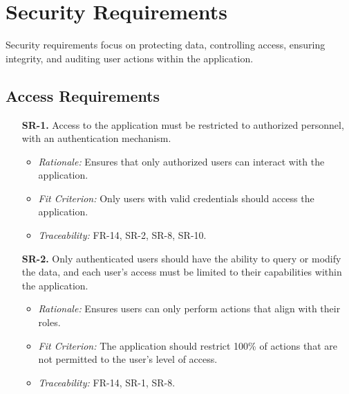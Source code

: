 \documentclass[12pt]{article}
\begin{document}
\section{Security Requirements}
Security requirements focus on protecting data, controlling access, ensuring
integrity, and auditing user actions within the application.

\subsection{Access Requirements}
\begin{enumerate}
  \item[\textbf{SR-1.}] Access to the application must be restricted to
  authorized personnel, with an authentication mechanism.
  \begin{itemize}
    \item \textit{Rationale:} Ensures that only authorized users can interact
    with the application.
    \item \textit{Fit Criterion:} Only users with valid credentials should
    access the application.
    \item \textit{Traceability:} FR-14, SR-2, SR-8, SR-10.
  \end{itemize}

  \item[\textbf{SR-2.}] Only authenticated users should have the ability to
  query or modify the data, and each user’s access must be limited to their
  capabilities within the application.
  \begin{itemize}
    \item \textit{Rationale:} Ensures users can only perform actions that align
    with their roles.
    \item \textit{Fit Criterion:} The application should restrict 100\% of
    actions that are not permitted to the user's level of access.
    \item \textit{Traceability:} FR-14, SR-1, SR-8.
  \end{itemize}
\end{enumerate}
\end{document}
